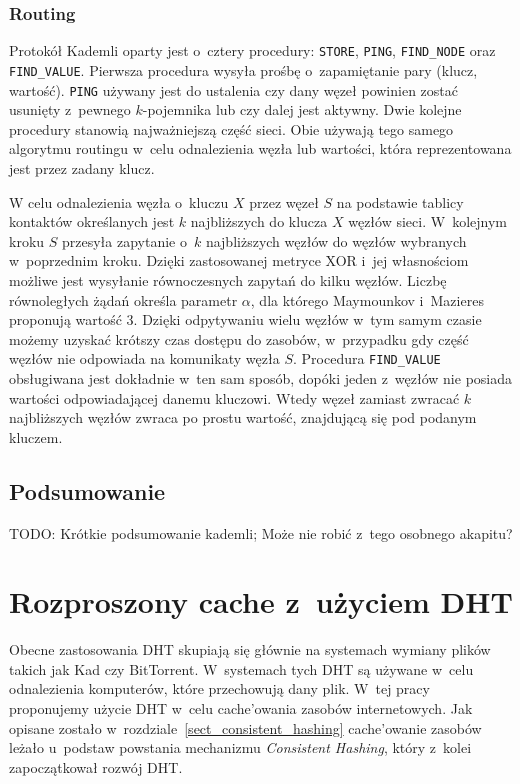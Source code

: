 \documentclass[a4paper,11pt]{scrartcl}
\newcommand{\f}{\texttt}
\newcommand{\s}{ }
\newcommand{\kesz}{cache}
\newcommand{\keszowania}{cache'owania}
\newcommand{\keszowanie}{cache'owanie}
\begin{document}
\subsubsection{Routing}
\label{kad_routing}
Protokół Kademli oparty jest o~cztery procedury: \f{STORE}, \f{PING}, \f{FIND\_NODE} oraz \f{FIND\_VALUE}. Pierwsza procedura wysyła prośbę o~zapamiętanie pary (klucz, wartość). \f{PING} używany jest do ustalenia czy dany węzeł powinien zostać usunięty z~pewnego $k$-pojemnika lub czy dalej jest aktywny. Dwie kolejne procedury stanowią najważniejszą część sieci. Obie używają tego samego algorytmu routingu w~celu odnalezienia węzła lub wartości, która reprezentowana jest przez zadany klucz.

W celu odnalezienia węzła o~kluczu $X$ przez węzeł $S$ na podstawie tablicy kontaktów określanych jest $k$ najbliższych do klucza $X$ węzłów sieci. W~kolejnym kroku $S$ przesyła zapytanie o~$k$ najbliższych węzłów do węzłów wybranych w~poprzednim kroku. Dzięki zastosowanej metryce XOR i~jej własnościom możliwe jest wysyłanie równoczesnych zapytań do kilku węzłów. Liczbę równoległych żądań określa parametr $\alpha$, dla którego Maymounkov i~Mazieres proponują wartość 3. Dzięki odpytywaniu wielu węzłów w~tym samym czasie możemy uzyskać krótszy czas dostępu do zasobów, w~przypadku gdy część węzłów nie odpowiada na komunikaty węzła $S$. Procedura \f{FIND\_VALUE} obsługiwana jest dokładnie w~ten sam sposób, dopóki jeden z~węzłów nie posiada wartości odpowiadającej danemu kluczowi. Wtedy węzeł zamiast zwracać $k$ najbliższych węzłów zwraca po prostu wartość, znajdującą się pod podanym kluczem.

\subsection{Podsumowanie}
TODO: Krótkie podsumowanie kademli; Może nie robić z~tego osobnego akapitu?

\section{Rozproszony \kesz\s z~użyciem DHT}
Obecne zastosowania DHT skupiają się głównie na systemach wymiany plików takich jak Kad czy BitTorrent. W~systemach tych DHT są używane w~celu odnalezienia komputerów, które przechowują dany plik. W~tej pracy proponujemy użycie DHT w~celu \keszowania\s zasobów internetowych. Jak opisane zostało w~rozdziale~\ref{sect_consistent_hashing} \keszowanie\s zasobów leżało u~podstaw powstania mechanizmu \textit{Consistent Hashing}, który z~kolei zapoczątkował rozwój DHT.
\end{document}
